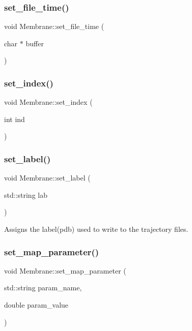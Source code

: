 \subsubsection{\texorpdfstring{set\_file\_time()}{set\_file\_time()}}
{\footnotesize\ttfamily void Membrane\+::set\+\_\+file\+\_\+time (\begin{DoxyParamCaption}\item[{char $\ast$}]{buffer }\end{DoxyParamCaption})\hspace{0.3cm}{\ttfamily [inline]}}

\mbox{\label{classMembrane_aaf51e7b1813da0f499d36664d7486db7}} 
\subsubsection{\texorpdfstring{set\_index()}{set\_index()}}
{\footnotesize\ttfamily void Membrane\+::set\+\_\+index (\begin{DoxyParamCaption}\item[{int}]{ind }\end{DoxyParamCaption})\hspace{0.3cm}{\ttfamily [inline]}}

\mbox{\label{classMembrane_a5d37c481f978d04a64ea0fd10f5e7708}} 
\subsubsection{\texorpdfstring{set\_label()}{set\_label()}}
{\footnotesize\ttfamily void Membrane\+::set\+\_\+label (\begin{DoxyParamCaption}\item[{std\+::string}]{lab }\end{DoxyParamCaption})\hspace{0.3cm}{\ttfamily [inline]}}

Assigns the label(pdb) used to write to the trajectory files. \mbox{\label{classMembrane_a58d16cfe9b99aebed6484ef9acbfcb95}} 
\subsubsection{\texorpdfstring{set\_map\_parameter()}{set\_map\_parameter()}}
{\footnotesize\ttfamily void Membrane\+::set\+\_\+map\+\_\+parameter (\begin{DoxyParamCaption}\item[{std\+::string}]{param\+\_\+name,  }\item[{double}]{param\+\_\+value }\end{DoxyParamCaption})}

